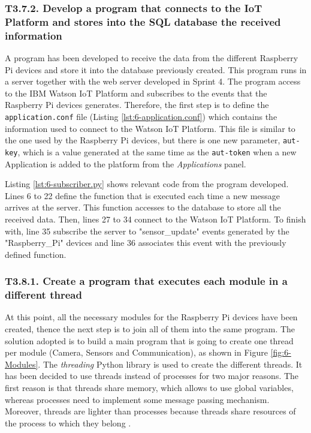 \subsubsection{T3.7.2. Develop a program that connects to the IoT Platform and stores into the SQL database the received information}

A program has been developed to receive the data from the different Raspberry Pi devices and store it into the database previously created. This program runs in a server together with the web server developed in Sprint 4. The program access to the IBM Watson IoT Platform and subscribes to the events that the Raspberry Pi devices generates. Therefore, the first step is to define the \texttt{application.conf} file (Listing \ref{lst:6-application.conf}) which contains the information used to connect to the Watson IoT Platform. This file is similar to the one used by the Raspberry Pi devices, but there is one new parameter, \texttt{aut-key}, which is a value generated at the same time as the \texttt{aut-token} when a new Application is added to the platform from the \textit{Applications} panel.

 


Listing \ref{lst:6-subscriber.py} shows relevant code from the program developed. Lines 6 to 22 define the function that is executed each time a new message arrives at the server. This function accesses to the database to store all the received data. Then, lines 27 to 34 connect to the Watson IoT Platform. To finish with, line 35 subscribe the server to "sensor\_update" events generated by the "Raspberry\_Pi" devices and line 36 associates this event with the previously defined function.




\subsubsection{T3.8.1. Create a program that executes each module in a different thread}

At this point, all the necessary modules for the Raspberry Pi devices have been created,  thence the next step is to join all of them into the same program. The solution adopted is to build a main program that is going to create one thread per module (Camera, Sensors and Communication), as shown in Figure \ref{fig:6-Modules}. The \textit{threading} Python library is used to create the different threads. It has been decided to use threads instead of processes for two major reasons. The first reason is that threads share memory, which allows to use global variables, whereas processes need to implement some message passing mechanism. Moreover, threads are lighter than processes because threads share resources of the process to which they belong \cite{SGG06}.

